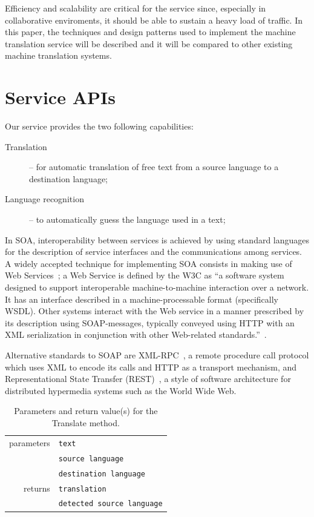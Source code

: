 \documentclass[11pt]{article}
\begin{document}
Efficiency and scalability are critical for the service since, especially in collaborative enviroments, it should be able to sustain a heavy load of traffic. In this paper, the techniques and design patterns used to implement the machine translation service will be described and it will be compared to other existing machine translation systems.



\section{Service APIs}

Our service provides the two following capabilities:

\begin{description}
  \item[Translation] -- for automatic translation of free text from a source language to a destination language;
  \item[Language recognition] -- to automatically guess the language used in a text;
\end{description}

In SOA, interoperability between services is achieved by using standard languages for the description of service interfaces and the communications among services. A widely accepted technique for implementing SOA consists in making use of Web Services~\citep{soa}; a Web  Service is defined by the W3C as ``a software system designed to support interoperable machine-to-machine interaction over a network. It has an interface described in a machine-processable format (specifically WSDL). Other systems interact with the Web service in a manner prescribed by its description using SOAP-messages, typically conveyed using HTTP with an XML serialization in conjunction with other Web-related standards.''~\citep{wsgloss}. 

Alternative standards to SOAP are XML-RPC~\citep{xmlrpcspec}, a remote procedure call protocol which uses XML to encode its calls and HTTP as a transport mechanism, and Representational State Transfer (REST)~\citep{rest}, a style of software architecture for distributed hypermedia systems such as the World Wide Web.

\begin{table}[!ht]
\begin{center}
 \begin{tabular}{|r|l|}
  \hline
   parameters	& {\tt\small text} \\ \cline{2-2}
   				& {\tt\small source language} \\ \cline{2-2}
   				& {\tt\small destination language} \\
  \hline \hline
   returns 	& {\tt\small translation} \\ \cline{2-2}
   			& {\tt\small detected source language} \\
  \hline
 \end{tabular}
\end{center}
\caption{Parameters and return value(s) for the Translate method.}
\label{tab:translate}
\end{table}
\end{document}
